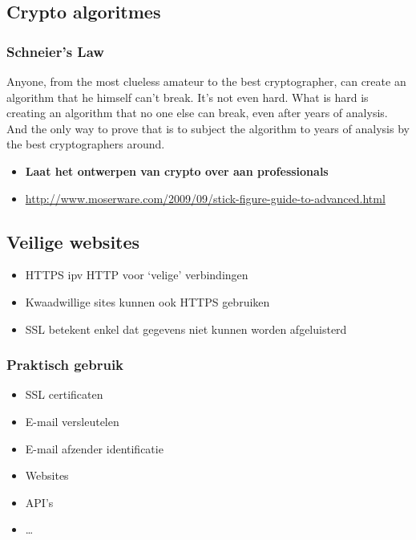 \documentclass{article}
\newcommand{\bold}[1]{\textbf{#1}}
\begin{document}
\subsection{Crypto algoritmes}

\subsubsection{Schneier's Law}

Anyone, from the most clueless amateur to the best cryptographer, 
can create an algorithm that he himself can't break. 
It's not even hard. What is hard is creating an algorithm that no one else can break, 
even after years of analysis. 
And the only way to prove that is to subject the algorithm to years of analysis by the best cryptographers around.


\begin{itemize}
    \item \bold{Laat het ontwerpen van crypto over aan professionals}
    \item \url{http://www.moserware.com/2009/09/stick-figure-guide-to-advanced.html}
\end{itemize}

\subsection{Veilige websites}

\begin{itemize}
    \item HTTPS ipv HTTP voor `velige' verbindingen
    \item Kwaadwillige sites kunnen ook HTTPS gebruiken
    \item SSL betekent enkel dat gegevens niet kunnen worden afgeluisterd
\end{itemize}

\subsubsection{Praktisch gebruik}

\begin{itemize}
    \item SSL certificaten
    \item E-mail versleutelen
    \item E-mail afzender identificatie
    \item Websites
    \item API's
    \item \dots
\end{itemize}
\end{document}
